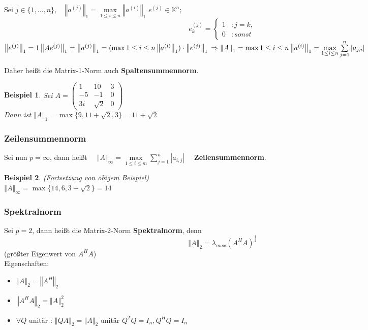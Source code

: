 \documentclass[a4paper,10pt]{article}
\newcommand{\norm}[1]{ \left\Vert #1 \right\Vert }
\newtheorem[L]{satz}{Satz}[section]
\newtheorem{bsp}{Beispiel}[section]
\newtheorem[S]{beweis}{Beweis}
\newtheorem[S]{beh}{Behauptung}
\begin{document}
  \bigskip

  Sei $ j \in \{1, \ldots, n\},\quad \norm{a^{(j)}}_1 = \max\limits_{1 \leq i\leq n} \norm{a^{(i)}}_1$
  $e^{(j)} \in \mathbb{K}^n; $
  \begin{equation*}
  e^{(j)}_k=
  \left\{
  \begin{aligned}
  1 &: j = k,\\
  0 &: sonst
  \end{aligned}
  \right.
  \end{equation*}
  $\norm{e^{(j)}}_1 = 1\\
  \norm{Ae^{(j)}}_1 = \norm{a^{(j)}}_1 = ( \max\limits{1 \leq i\leq n} \norm{a^{(i)}}_1) \cdot \norm{e^{(j)}}_1\\
  \Rightarrow \norm{A}_1 = \max\limits{1 \leq i\leq n} \norm{a^{(i)}}_1 = \max\limits_{1 \leq i \leq n} \sum\limits_{j = 1}^n{|a_{j,i}|}$

  \medskip

  Daher heißt die Matrix-1-Norm auch \textbf{Spaltensummennorm}.\\

  \bigskip

  \begin{bsp}
  Sei $A = 
  \begin{pmatrix}
  1 & 10 & 3\\
  -5 & -1 & 0\\
  3i & \sqrt{2} & 0
  \end{pmatrix}$\\
  Dann ist $\norm{A}_1 = \max\{9, 11 + \sqrt{2}, 3\} = 11 + \sqrt{2}$
  \end{bsp}

\subsubsection{Zeilensummennorm}
  Sei nun $p = \infty$, dann heißt
  $\quad \norm{A}_\infty = \max\limits_{1\leq i \leq m}\sum\limits_{j=1}^n | a_{i,j}| \quad$
  \textbf{Zeilensummennorm}.

\begin{bsp}
(Fortsetzung von obigem Beispiel)\\
 $\norm{A}_\infty = \max\{14, 6, 3+\sqrt{2}\} = 14$
\end{bsp}

\subsubsection{Spektralnorm}
Sei $ p = 2$, dann heißt die Matrix-2-Norm \textbf{Spektralnorm}, denn $$\norm{A}_2 = \lambda_{max} (A^H  A)^\frac{1}{2}$$
(größter Eigenwert von $A^H A$)\\
Eigenschaften:\\
\begin{itemize}
 \item $\norm{A}_2 = \norm{A^H}_2$
 \item $\norm{A^H A}_2 = \norm{A}_2^2$
 \item $\forall Q$ unitär : $\norm{Q A}_2 = \norm{A}_2$ \hfill unitär $Q^T Q = I_n, Q^H Q = I_n$
\end{itemize}
\end{document}

